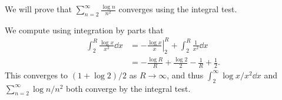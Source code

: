 \documentclass[a4paper]{scrartcl}
\begin{document}
\begin{example}
	We will prove that $\sum_{n = 2}^{\infty} \frac{\log n}{n^2}$ converges using the integral test.

	We compute using integration by parts that
	\begin{align*}
		\int_2^R \frac{\log x}{x^2} \dd x &= -\left.\frac{\log x}{x} \right|_2^R + \int_2^R \frac{1}{x^2} \dd x \\
		&= - \frac{\log R}{R} + \frac{\log 2}{2} - \frac{1}{R} + \frac{1}{2}.
	\end{align*}
	This converges to $(1 + \log 2)/2$ as $R \rightarrow \infty$, and thus $\int_2^{\infty} \log x/x^2 \dd x$ and $\sum_{n = 2}^{\infty} \log n/n^2$ both converge by the integral test.
\end{example}
\end{document}

